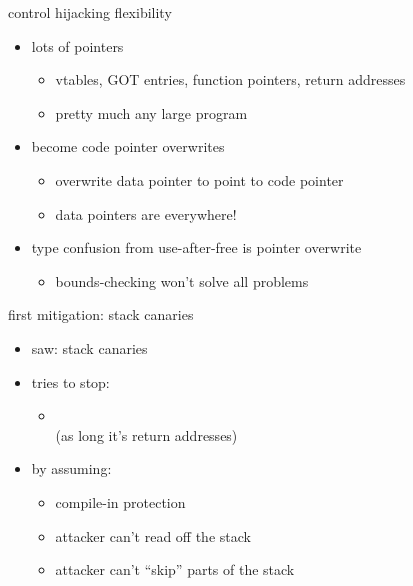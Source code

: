\begin{frame}{control hijacking flexibility}
    \begin{itemize}
        \item lots of  pointers 
        \begin{itemize}
            \item vtables, GOT entries, function pointers, return addresses
            \item pretty much any large program
        \end{itemize}
    \item {} become code pointer overwrites
        \begin{itemize}
            \item overwrite data pointer to point to code pointer
            \item data pointers are everywhere!
        \end{itemize}
    \item type confusion from use-after-free is pointer overwrite
        \begin{itemize}
            \item bounds-checking won't solve all problems
        \end{itemize}
    \end{itemize}
\end{frame}


\begin{frame}{first mitigation: stack canaries}
    \begin{itemize}
    \item saw: stack canaries
    \item tries to stop:
        \begin{itemize}
        \item {} \\
             (as long it's return addresses)
        \end{itemize}
    \item by assuming:
        \begin{itemize}
        \item compile-in protection
        \item attacker can't read off the stack
        \item attacker can't ``skip'' parts of the stack
        \end{itemize}
    \end{itemize}
\end{frame}

